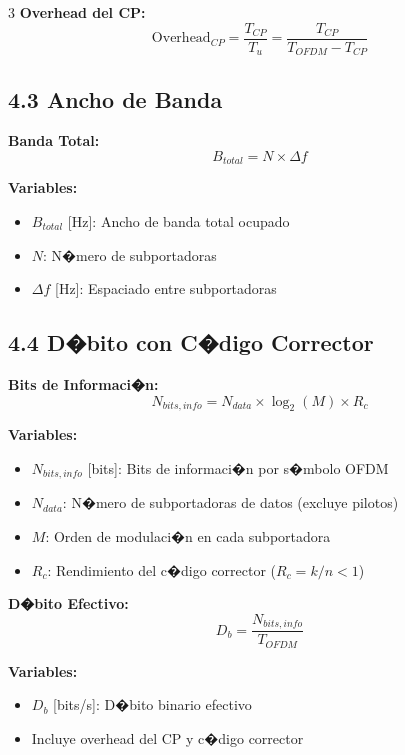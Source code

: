 ﻿\documentclass[8pt,a4paper]{article}
\begin{document}
\begin{multicols}{3}
\textbf{Overhead del CP:}
\[
\text{Overhead}_{CP} = \frac{T_{CP}}{T_u} = \frac{T_{CP}}{T_{OFDM} - T_{CP}}
\]

\vspace{-2mm}
\subsection*{\small 4.3 Ancho de Banda}
\vspace{-2mm}

\textbf{Banda Total:}
\[
B_{total} = N \times \Delta f
\]

\textbf{Variables:}
\begin{itemize}[leftmargin=*,itemsep=0pt]
    \item $B_{total}$ [Hz]: Ancho de banda total ocupado
    \item $N$: N�mero de subportadoras
    \item $\Delta f$ [Hz]: Espaciado entre subportadoras
\end{itemize}

\vspace{-2mm}
\subsection*{\small 4.4 D�bito con C�digo Corrector}
\vspace{-2mm}

\textbf{Bits de Informaci�n:}
\[
N_{bits,info} = N_{data} \times \log_2(M) \times R_c
\]

\textbf{Variables:}
\begin{itemize}[leftmargin=*,itemsep=0pt]
    \item $N_{bits,info}$ [bits]: Bits de informaci�n por s�mbolo OFDM
    \item $N_{data}$: N�mero de subportadoras de datos (excluye pilotos)
    \item $M$: Orden de modulaci�n en cada subportadora
    \item $R_c$: Rendimiento del c�digo corrector ($R_c = k/n < 1$)
\end{itemize}

\textbf{D�bito Efectivo:}
\[
D_b = \frac{N_{bits,info}}{T_{OFDM}}
\]

\textbf{Variables:}
\begin{itemize}[leftmargin=*,itemsep=0pt]
    \item $D_b$ [bits/s]: D�bito binario efectivo
    \item Incluye overhead del CP y c�digo corrector
\end{itemize}


\end{multicols}
\end{document}
